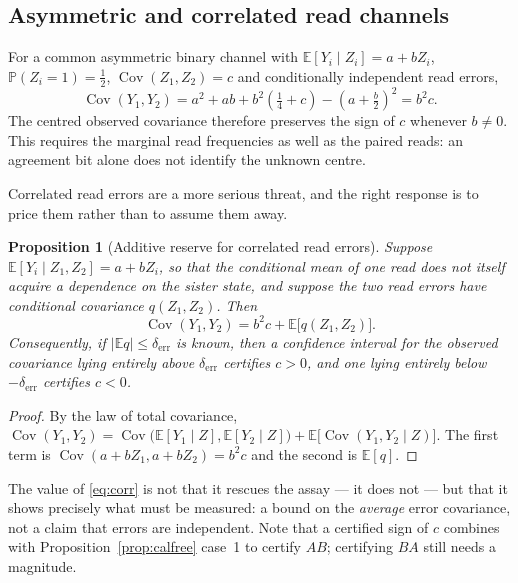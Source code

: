 \documentclass[11pt]{article}
\theoremstyle{plain}
\newtheorem{proposition}[theorem]{Proposition}
\theoremstyle{definition}
\theoremstyle{remark}
\newcommand{\E}{\mathbb E}
\newcommand{\Prob}{\mathbb P}
\newcommand{\Cov}{\operatorname{Cov}}
\begin{document}
\subsection{Asymmetric and correlated read channels}

For a common asymmetric binary channel with $\E[Y_i\mid Z_i]=a+bZ_i$,
$\Prob(Z_i=1)=\tfrac12$, $\Cov(Z_1,Z_2)=c$ and conditionally independent read
errors,
\begin{equation}\label{eq:asym}
 \Cov(Y_1,Y_2)=a^2+ab+b^2(\tfrac14+c)-(a+\tfrac b2)^2=b^2c .
\end{equation}
The centred observed covariance therefore preserves the sign of $c$ whenever
$b\ne0$. This requires the marginal read frequencies as well as the paired
reads: an agreement bit alone does not identify the unknown centre.

Correlated read errors are a more serious threat, and the right response is to
price them rather than to assume them away.

\begin{proposition}[Additive reserve for correlated read errors]\label{prop:corr}
Suppose $\E[Y_i\mid Z_1,Z_2]=a+bZ_i$, so that the conditional mean of one read
does not itself acquire a dependence on the sister state, and suppose the two
read errors have conditional covariance $q(Z_1,Z_2)$. Then
\begin{equation}\label{eq:corr}
 \Cov(Y_1,Y_2)=b^2c+\E\bigl[q(Z_1,Z_2)\bigr].
\end{equation}
Consequently, if $\bigl|\E q\bigr|\le\delta_{\mathrm{err}}$ is known, then a
confidence interval for the observed covariance lying entirely above
$\delta_{\mathrm{err}}$ certifies $c>0$, and one lying entirely below
$-\delta_{\mathrm{err}}$ certifies $c<0$.
\end{proposition}

\begin{proof}
By the law of total covariance,
$\Cov(Y_1,Y_2)=\Cov\bigl(\E[Y_1\mid Z],\E[Y_2\mid Z]\bigr)
+\E\bigl[\Cov(Y_1,Y_2\mid Z)\bigr]$. The first term is
$\Cov(a+bZ_1,a+bZ_2)=b^2c$ and the second is $\E[q]$.
\end{proof}

The value of \eqref{eq:corr} is not that it rescues the assay --- it does not
--- but that it shows precisely what must be measured: a bound on the
\emph{average} error covariance, not a claim that errors are independent. Note
that a certified sign of $c$ combines with Proposition~\ref{prop:calfree}
case~1 to certify $AB$; certifying $BA$ still needs a magnitude.
\end{document}
